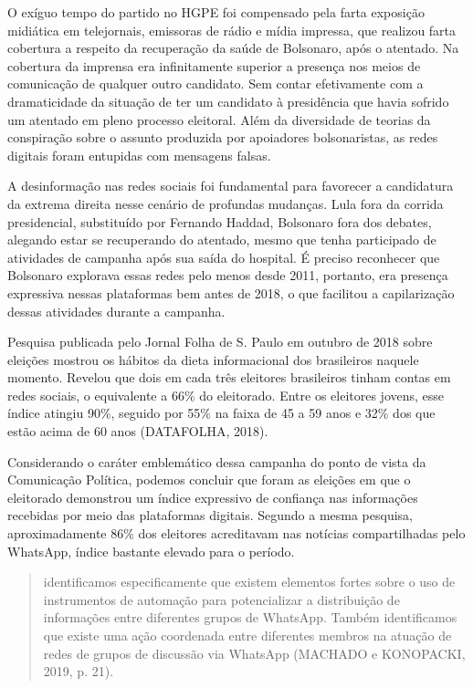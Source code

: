 O exíguo tempo do partido no HGPE foi compensado pela farta exposição
midiática em telejornais, emissoras de rádio e mídia impressa, que
realizou farta cobertura a respeito da recuperação da saúde de
Bolsonaro, após o atentado. Na cobertura da imprensa era infinitamente
superior a presença nos meios de comunicação de qualquer outro
candidato. Sem contar efetivamente com a dramaticidade da situação de
ter um candidato à presidência que havia sofrido um atentado em pleno
processo eleitoral. Além da diversidade de teorias da conspiração sobre
o assunto produzida por apoiadores bolsonaristas, as redes digitais
foram entupidas com mensagens falsas.

A desinformação nas redes sociais foi fundamental para favorecer a
candidatura da extrema direita nesse cenário de profundas mudanças. Lula
fora da corrida presidencial, substituído por Fernando Haddad, Bolsonaro
fora dos debates, alegando estar se recuperando do atentado, mesmo que
tenha participado de atividades de campanha após sua saída do hospital.
É preciso reconhecer que Bolsonaro explorava essas redes pelo menos
desde 2011, portanto, era presença expressiva nessas plataformas bem
antes de 2018, o que facilitou a capilarização dessas atividades durante
a campanha.

Pesquisa publicada pelo Jornal Folha de S. Paulo em outubro de 2018
sobre eleições mostrou os hábitos da dieta informacional dos brasileiros
naquele momento. Revelou que dois em cada três eleitores brasileiros
tinham contas em redes sociais, o equivalente a 66\% do eleitorado.
Entre os eleitores jovens, esse índice atingiu 90\%, seguido por 55\% na
faixa de 45 a 59 anos e 32\% dos que estão acima de 60 anos (DATAFOLHA,
2018).

Considerando o caráter emblemático dessa campanha do ponto de vista da
Comunicação Política, podemos concluir que foram as eleições em que o
eleitorado demonstrou um índice expressivo de confiança nas informações
recebidas por meio das plataformas digitais. Segundo a mesma pesquisa,
aproximadamente 86\% dos eleitores acreditavam nas notícias
compartilhadas pelo WhatsApp, índice bastante elevado para o período.

\begin{quote}
identificamos especificamente que existem elementos fortes sobre o uso
de instrumentos de automação para potencializar a distribuição de
informações entre diferentes grupos de WhatsApp. Também identificamos
que existe uma ação coordenada entre diferentes membros na atuação de
redes de grupos de discussão via WhatsApp (MACHADO e KONOPACKI, 2019, p.
21).
\end{quote}

